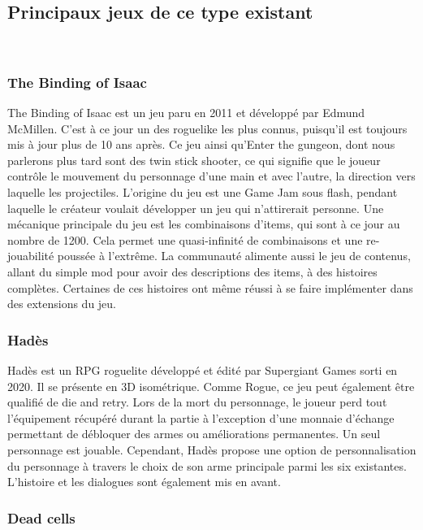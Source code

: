 \documentclass[12pt,a4paper]{article}
\begin{document}
\subsection{\textbf {Principaux jeux de ce type existant}}
\\
\normalsize{\subsubsection{The Binding of Isaac}}
The Binding of Isaac est un jeu paru en 2011 et développé par Edmund McMillen. C’est à ce jour un des roguelike les plus connus, puisqu'il est toujours mis à jour plus de 10 ans après. Ce jeu ainsi qu’Enter the gungeon, dont nous parlerons plus tard sont des twin stick shooter, ce qui signifie que le joueur contrôle le mouvement du personnage d’une main et avec l'autre, la direction vers laquelle les projectiles. L’origine du jeu est une { Game Jam sous flash, pendant laquelle le créateur} voulait développer un jeu qui n’attirerait personne. Une mécanique principale du jeu est les combinaisons d’items, qui sont à ce jour au nombre de 1200. Cela permet une quasi-infinité de combinaisons et une re-jouabilité poussée à l’extrême. La communauté alimente aussi le jeu de contenus, allant du simple mod pour avoir des descriptions des items, à des histoires complètes. Certaines de ces histoires ont même réussi à se faire implémenter dans des extensions du jeu.
\\
\vspace*{.1cm}
\normalsize{\subsubsection{Hadès}}
Hadès est un RPG roguelite développé et édité par Supergiant Games sorti en 2020. Il se présente en 3D isométrique. Comme Rogue, ce jeu peut également être qualifié de die and retry. Lors de la mort du personnage, le joueur perd tout l'équipement récupéré durant la partie à l'exception d'une monnaie d'échange permettant de débloquer des armes ou améliorations permanentes. Un seul personnage est jouable. Cependant, Hadès propose une option de personnalisation du personnage à travers le choix de son arme principale parmi les six existantes. L’histoire et les dialogues sont également mis en avant. 
\\
\newpage
\vspace*{1mm}
\normalsize{\subsubsection{Dead cells}}
\end{document}
